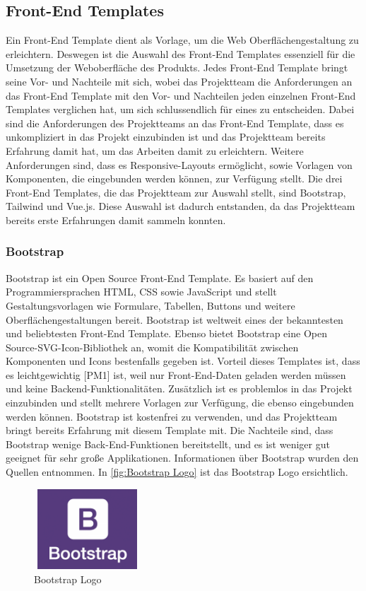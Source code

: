 \subsection{Front-End Templates}
Ein Front-End Template dient als Vorlage, um die Web Oberflächengestaltung zu erleichtern.
Deswegen ist die Auswahl des Front-End Templates essenziell für die Umsetzung der Weboberfläche des Produkts. Jedes Front-End Template bringt seine Vor- und Nachteile mit sich, wobei das Projektteam die Anforderungen an das Front-End Template mit den Vor- und Nachteilen jeden einzelnen Front-End Templates verglichen hat, um sich schlussendlich für eines zu entscheiden. Dabei sind die Anforderungen des Projektteams an das Front-End Template, dass es unkompliziert in das Projekt einzubinden ist und das Projektteam bereits Erfahrung damit hat, um das Arbeiten damit zu erleichtern. Weitere Anforderungen sind, dass es Responsive-Layouts ermöglicht, sowie Vorlagen von Komponenten, die eingebunden werden können, zur Verfügung stellt. Die drei Front-End Templates, die das Projektteam zur Auswahl stellt, sind Bootstrap, Tailwind und Vue.js. Diese Auswahl ist dadurch entstanden, da das Projektteam bereits erste Erfahrungen damit sammeln konnten.


\subsubsection{Bootstrap}\label{sec Bootstrap}
Bootstrap ist ein Open Source Front-End Template. Es basiert auf den Programmiersprachen HTML, CSS sowie JavaScript und stellt Gestaltungsvorlagen wie Formulare, Tabellen, Buttons und weitere Oberflächengestaltungen bereit. Bootstrap ist weltweit eines der bekanntesten und beliebtesten Front-End Template. Ebenso bietet Bootstrap eine Open Source-SVG-Icon-Bibliothek an, womit die Kompatibilität zwischen Komponenten und Icons bestenfalls gegeben ist. Vorteil dieses Templates ist, dass es leichtgewichtig [PM1] ist, weil nur Front-End-Daten geladen werden müssen und keine Backend-Funktionalitäten. Zusätzlich ist es problemlos in das Projekt einzubinden und stellt mehrere Vorlagen zur Verfügung, die ebenso eingebunden werden können. Bootstrap ist kostenfrei zu verwenden, und das Projektteam bringt bereits Erfahrung mit diesem Template mit. Die Nachteile sind, dass Bootstrap wenige Back-End-Funktionen bereitstellt, und es ist weniger gut geeignet für sehr große Applikationen. Informationen über Bootstrap wurden den Quellen \cite{Bootstrap1, Bootstrap2, Bootstrap3,Bootstrap4}  entnommen.
 In \autoref{fig:Bootstrap Logo}
 ist das Bootstrap Logo ersichtlich.
\newline
\begin{figure}[h]
	\centering
	\includegraphics[height=3cm,width=4cm]{images/Bootstrap}
	\caption{Bootstrap Logo}
	\label{fig:Bootstrap Logo}
\end{figure}

